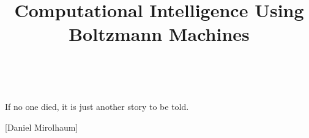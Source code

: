 \documentclass[a4paper,12pt,oneside,onecolumn,final,fleqn]{config/repUERJ}
\title{Computational Intelligence Using Boltzmann Machines}
\begin{document}
\frontmatter
\capa%
\folhaderosto%




\fichacatalografica{}

\begin{folhadeaprovacao}
\end{folhadeaprovacao}
%
%
\pretextualchapter{}

\vfill\
\begin{flushright}
    If no one died, it is just another story to be told.
    
    [Daniel Mirolhaum]
\end{flushright}
\end{document}
